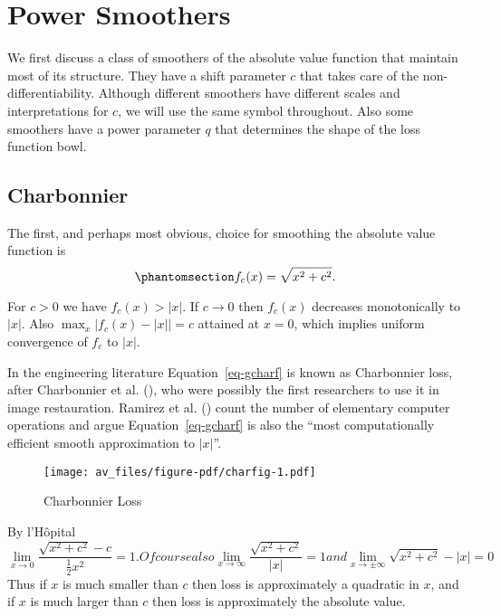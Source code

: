 \documentclass[
  12pt,
  letterpaper,
  DIV=11,
  numbers=noendperiod]{scrartcl}
\newcommand{\sectionbreak}{\pagebreak}
\theoremstyle{plain}
\theoremstyle{plain}
\theoremstyle{plain}
\theoremstyle{definition}
\theoremstyle{remark}
\begin{document}
\sectionbreak

\section{Power Smoothers}\label{power-smoothers}

We first discuss a class of smoothers of the absolute value function
that maintain most of its structure. They have a shift parameter \(c\)
that takes care of the non-differentiability. Although different
smoothers have different scales and interpretations for \(c\), we will
use the same symbol throughout. Also some smoothers have a power
parameter \(q\) that determines the shape of the loss function bowl.

\subsection{Charbonnier}\label{charbonnier}

The first, and perhaps most obvious, choice for smoothing the absolute
value function is \begin{equation}\phantomsection\label{eq-charf}{
f_c(x)=\sqrt{x^2 + c^2}.
}\end{equation}

For \(c>0\) we have \(f_c(x)>|x|\). If \(c\rightarrow 0\) then
\(f_c(x)\) decreases monotonically to \(|x|\). Also
\(\max_x|f_c(x)-|x||=c\) attained at \(x=0\), which implies uniform
convergence of \(f_c\) to \(|x|\).

In the engineering literature Equation~\ref{eq-gcharf} is known as
Charbonnier loss, after Charbonnier et al.
(), who
were possibly the first researchers to use it in image restauration.
Ramirez et al.
() count the
number of elementary computer operations and argue
Equation~\ref{eq-gcharf} is also the ``most computationally efficient
smooth approximation to \(|x|\)''.

\begin{figure}[H]

{\centering \texttt{[image: av\_files/figure-pdf/charfig-1.pdf]}

}

\caption{Charbonnier Loss}

\end{figure}%

By l'Hôpital \begin{subequations}
\begin{equation}
\lim_{x\rightarrow 0}\frac{\sqrt{x^2+c^2}-c}{\frac12x^2}=1.
\end{equation}
Of course also
\begin{equation}
\lim_{x\rightarrow\infty}\frac{\sqrt{x^2+c^2}}{|x|}=1
\end{equation}
and
\begin{equation}
\lim_{x\rightarrow\pm\infty}\sqrt{x^2+c^2}-|x|=0
\end{equation}
\end{subequations} Thus if \(x\) is much smaller than \(c\) then loss is
approximately a quadratic in \(x\), and if \(x\) is much larger than
\(c\) then loss is approximately the absolute value.
\end{document}
